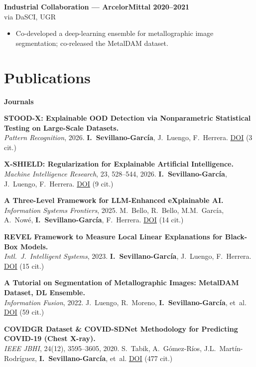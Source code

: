 \documentclass[10pt,a4paper]{article}
\newcommand{\blueitem}[1]{\textcolor{subtitleblue}{\textbf{#1}}}
\newcommand{\sub}[1]{\textcolor{subtle}{\footnotesize #1}}
\begin{document}
\blueitem{Industrial Collaboration --- ArcelorMittal \hfill 2020--2021} \\
\sub{via DaSCI, UGR}
\begin{itemize}
    \item Co-developed a deep-learning ensemble for metallographic image segmentation; co-released the MetalDAM dataset.
\end{itemize}

\section*{Publications}

\small

\blueitem{Journals}

\textbf{STOOD-X: Explainable OOD Detection via Nonparametric Statistical Testing on Large-Scale Datasets.} \\
\sub{\textit{Pattern Recognition}, 2026. \textbf{I.~Sevillano-García}, J.~Luengo, F.~Herrera. \href{https://doi.org/10.1016/j.patcog.2026.113254}{DOI} \quad (3 cit.)}

\textbf{X-SHIELD: Regularization for Explainable Artificial Intelligence.} \\
\sub{\textit{Machine Intelligence Research}, 23, 528--544, 2026. \textbf{I.~Sevillano-García}, J.~Luengo, F.~Herrera. \href{https://doi.org/10.1007/s11633-025-1576-y}{DOI} \quad (9 cit.)}

\textbf{A Three-Level Framework for LLM-Enhanced eXplainable AI.} \\
\sub{\textit{Information Systems Frontiers}, 2025. M.~Bello, R.~Bello, M.M.~García, A.~Nowé, \textbf{I.~Sevillano-García}, F.~Herrera. \href{https://doi.org/10.1007/s10796-025-10668-1}{DOI} \quad (14 cit.)}

\textbf{REVEL Framework to Measure Local Linear Explanations for Black-Box Models.} \\
\sub{\textit{Intl.~J.~Intelligent Systems}, 2023. \textbf{I.~Sevillano-García}, J.~Luengo, F.~Herrera. \href{https://doi.org/10.1155/2023/8068569}{DOI} \quad (15 cit.)}

\textbf{A Tutorial on Segmentation of Metallographic Images: MetalDAM Dataset, DL Ensemble.} \\
\sub{\textit{Information Fusion}, 2022. J.~Luengo, R.~Moreno, \textbf{I.~Sevillano-García}, et~al. \href{https://doi.org/10.1016/j.inffus.2021.09.018}{DOI} \quad (59 cit.)}

\textbf{COVIDGR Dataset \& COVID-SDNet Methodology for Predicting COVID-19 (Chest X-ray).} \\
\sub{\textit{IEEE JBHI}, 24(12), 3595--3605, 2020. S.~Tabik, A.~Gómez-Ríos, J.L.~Martín-Rodríguez, \textbf{I.~Sevillano-García}, et~al. \href{https://doi.org/10.1109/JBHI.2020.3037127}{DOI} \quad (477 cit.)}
\end{document}
